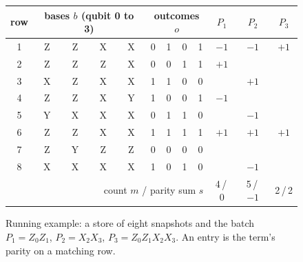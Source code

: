 
\begin{figure}[t]
\centering
\small\setlength{\tabcolsep}{3.2pt}
\begin{tabular}{c|cccc|cccc|ccc}
\hline
row & \multicolumn{4}{c|}{bases $b$ (qubit 0 to 3)} & \multicolumn{4}{c|}{outcomes $o$} & $P_1$ & $P_2$ & $P_3$ \\
\hline
1 & Z & Z & X & X & 0 & 1 & 0 & 1 & $-1$ & $-1$ & $+1$ \\
2 & Z & Z & Z & X & 0 & 0 & 1 & 1 & $+1$ & & \\
3 & X & Z & X & X & 1 & 1 & 0 & 0 & & $+1$ & \\
4 & Z & Z & X & Y & 1 & 0 & 0 & 1 & $-1$ & & \\
5 & Y & X & X & X & 0 & 1 & 1 & 0 & & $-1$ & \\
6 & Z & Z & X & X & 1 & 1 & 1 & 1 & $+1$ & $+1$ & $+1$ \\
7 & Z & Y & Z & Z & 0 & 0 & 0 & 0 & & & \\
8 & X & X & X & X & 1 & 0 & 1 & 0 & & $-1$ & \\
\hline
\multicolumn{9}{r|}{count $m$ / parity sum $s$} & 4\,/\,0 & 5\,/\,$-1$ & 2\,/\,2 \\
\hline
\end{tabular}
\caption{Running example: a store of eight snapshots and the batch $P_1=Z_0Z_1$, $P_2=X_2X_3$, $P_3=Z_0Z_1X_2X_3$.
An entry is the term's parity on a matching row.}\label{fig:example}
\end{figure}

